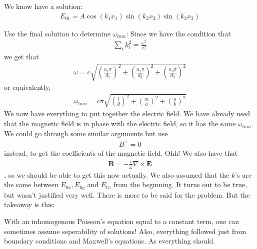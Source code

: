 We know have a solution: \begin{align*}
    E_{01} = A \cos (k_1 x_1) \sin (k_2 x_2) \sin (k_3 x_3)
\end{align*}

Use the final solution to determine \(\omega_{lmn} \): 
Since we have the condition that \begin{align*}
    \sum_{i} k^{2} _i = \frac{\omega^{2}}{c^{2} }   
\end{align*}
we get that \begin{align*}
    \omega = c \sqrt{\left( \frac{n_1 \pi }{d_1} \right)^{2} + \left( \frac{n_2 \pi }{d_2} \right)^{2} + \left( \frac{n_3 \pi }{d_3} \right)^{2}} 
\end{align*}
or equivalently, \begin{align*}
    \omega_{lmn}  = c \pi \sqrt{\left( \frac{l}{d} \right)^{2} + \left( \frac{m }{a} \right)^{2} + \left( \frac{n}{b} \right)^{2}}
\end{align*}
We now have everything to put together the electric field. We have already used that the magnetic field is in phase with the electric field, so it has the same \(\omega_{lmn}\). We could go through some similar arguments but use \begin{align*}
    B^\perp = 0
\end{align*} 
instead, to get the coefficients of the magnetic field. Ohh! We also have that \begin{align*}
    \mathbf{B} = - \frac{i}{\omega } \nabla \times \mathbf{E}
\end{align*}, so we should be able to get this now actually. We also assumed that the \(k\)'s are the same between \(E_{0x}, E_{0y}\) and \(E_{0z} \) from the beginning. It turns out to be true, but wasn't justified very well. There is more to be said for the problem. But the takeaway is this:

With an inhomogenous Poisson's equation equal to a constant term, one can sometimes assume seperability of solutions! Also, everything followed just from boundary conditions and Maxwell's equations. As everything should. 
